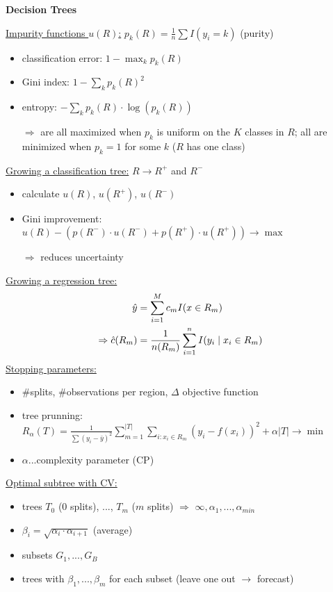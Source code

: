 \documentclass[10pt,landscape,a4paper]{article}
\begin{document}
\begin{multicols*}{4}
\begin{center}
	\normalsize{\textbf{Decision Trees}} \\
\end{center}
\underline{Impurity functions $u(R)$:} $p_k(R) = \frac{1}{n}\sum I(y_i=k)$ (purity)
\begin{itemize}
	\item classification error: $1-\max_k p_k(R)$
	\item Gini index: $1-\sum_k p_k(R)^2$
	\item entropy: $-\sum_k p_k(R)\cdot\log(p_k(R))$
	\item[$\Rightarrow$] are all maximized when $p_k$ is uniform on the $K$ classes in $R$; all are minimized when $p_k = 1$ for some $k$ ($R$ has one class)
\end{itemize}
\underline{Growing a classification tree:} $R\to R^+$ and $R^-$
\begin{itemize}
	\item calculate $u(R)$, $u(R^+)$, $u(R^-)$
	\item Gini improvement: $u(R) - (p(R^-)\cdot u(R^-) + p(R^+)\cdot u(R^+)) \to\max$
	\item[$\Rightarrow$] reduces uncertainty
\end{itemize}
\underline{Growing a regression tree:}
\begin{align}
	\hat{y} &= \sum_{i=1}^M c_mI(x\in R_m) \notag \\
	\Rightarrow \hat{c}(R_m) &= \frac{1}{n(R_m)}\sum_{i=1}^n I(y_i\mid x_i\in R_m) \notag
\end{align}
\underline{Stopping parameters:}
\begin{itemize}
	\item \#splits, \#observations per region, $\Delta$ objective function
	\item tree prunning: $R_\alpha(T) = \frac{1}{\sum (y_i-\bar{y})^2}\sum_{m=1}^{\vert T\vert}\sum_{i:x_i\in R_m} (y_i-f(x_i))^2 + \alpha\vert T\vert\to\min$
	\item $\alpha$...complexity parameter (CP)
\end{itemize}
\underline{Optimal subtree with CV:}
\begin{itemize}
	\item trees $T_0$ (0 splits), ..., $T_m$ ($m$ splits) $\Rightarrow$ $\infty,\alpha_1,...,\alpha_{min}$
	\item $\beta_i = \sqrt{\alpha_i \cdot\alpha_{i+1}}$ (average)
	\item subsets $G_1,...,G_B$
	\item trees with $\beta_1,...,\beta_m$ for each subset (leave one out $\to$ forecast)

\end{itemize}
\end{multicols*}
\end{document}
